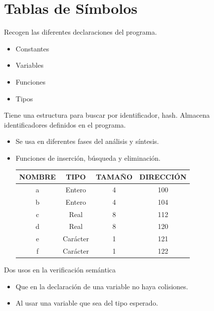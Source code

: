 \documentclass[12pt, twoside, openright]{report} %
\begin{document}
\section{Tablas de Símbolos}
Recogen las diferentes declaraciones del programa.
\begin{itemize}
	\item Constantes
	\item Variables
	\item Funciones
	\item Tipos
\end{itemize}

Tiene una estructura para buscar por identificador, hash. Almacena identificadores definidos en el programa.
\begin{itemize}
	\item Se usa en diferentes fases del análisis y síntesis.
	\item Funciones de inserción, búsqueda y eliminación.

	      \begin{table}[h]
		      \begin{tabular}{|c|c|c|c|}
			      \hline
			      \textbf{NOMBRE} & \textbf{TIPO} & \textbf{TAMAÑO} & \textbf{DIRECCIÓN} \\ \hline
			      a               & Entero        & 4               & 100                \\ \hline
			      b               & Entero        & 4               & 104                \\ \hline
			      c               & Real          & 8               & 112                \\ \hline
			      d               & Real          & 8               & 120                \\ \hline
			      e               & Carácter      & 1               & 121                \\ \hline
			      f               & Carácter      & 1               & 122                \\ \hline
		      \end{tabular}
	      \end{table}
\end{itemize}
\pagebreak
Dos usos en la verificación semántica
\begin{itemize}
	\item Que en la declaración de una variable no haya colisiones.
	\item Al usar una variable que sea del tipo esperado.
\end{itemize}
\end{document}
